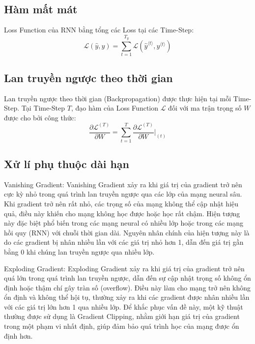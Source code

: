 \subsection{Hàm mất mát}

Loss Function của RNN bằng tổng các Loss tại các Time-Step:
\begin{equation*}
    \mathcal{L}(\hat{y}, y) = \sum_{t=1}^{T_y} \mathcal{L}(\hat{y}^{\langle t \rangle}, y^{\langle t \rangle})
\end{equation*}

\subsection{Lan truyền ngược theo thời gian}

Lan truyền ngược theo thời gian (Backpropagation) được thực hiện tại mỗi Time-Step. Tại Time-Step $T$, đạo hàm của Loss Function $\mathcal{L}$ đối với ma trận trọng số $W$ được cho bởi công thức:
\begin{equation*}
    \frac{\partial \mathcal{L}^{(T)}}{\partial W} = \sum_{t=1}^{T} \frac{\partial \mathcal{L}^{(T)}}{\partial W}\Big|_{(t)}
\end{equation*}

\subsection{Xử lí phụ thuộc dài hạn}
Vanishing Gradient: Vanishing Gradient xảy ra khi giá trị của gradient trở nên cực kỳ nhỏ trong quá trình lan truyền ngược qua các lớp của mạng neural sâu. Khi gradient trở nên rất nhỏ, các trọng số của mạng không thể cập nhật hiệu quả, điều này khiến cho mạng không học được hoặc học rất chậm. Hiện tượng này đặc biệt phổ biến trong các mạng neural có nhiều lớp hoặc trong các mạng hồi quy (RNN) với chuỗi thời gian dài. Nguyên nhân chính của hiện tượng này là do các gradient bị nhân nhiều lần với các giá trị nhỏ hơn 1, dẫn đến giá trị gần bằng 0 khi chúng lan truyền ngược qua nhiều lớp.

Exploding Gradient: Exploding Gradient xảy ra khi giá trị của gradient trở nên quá lớn trong quá trình lan truyền ngược, dẫn đến sự cập nhật trọng số không ổn định hoặc thậm chí gây tràn số (overflow). Điều này làm cho mạng trở nên không ổn định và không thể hội tụ, thường xảy ra khi các gradient được nhân nhiều lần với các giá trị lớn hơn 1 qua nhiều lớp. Để khắc phục vấn đề này, một kỹ thuật thường được sử dụng là Gradient Clipping, nhằm giới hạn giá trị của gradient trong một phạm vi nhất định, giúp đảm bảo quá trình học của mạng được ổn định hơn.

